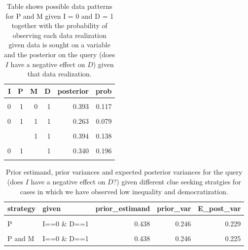 \documentclass[
  12pt,
]{book}
\begin{document}
\begin{table}

\caption{\label{tab:possibleoutcomespimdi0}Table shows possible data patterns for P and M given I = 0 and D = 1 together with the probability of observing each data realization given data is sought on a variable and the posterior on the query (does $I$ have a negative effect on $D$) given that data realization.}
\centering
\begin{tabular}[t]{rrrrrr}
\toprule
I & P & M & D & posterior & prob\\
\midrule
\cellcolor{gray!6}{0} & \cellcolor{gray!6}{0} & \cellcolor{gray!6}{0} & \cellcolor{gray!6}{1} & \cellcolor{gray!6}{0.667} & \cellcolor{gray!6}{0.050}\\
0 & 1 & 0 & 1 & 0.393 & 0.117\\
\cellcolor{gray!6}{0} & \cellcolor{gray!6}{0} & \cellcolor{gray!6}{1} & \cellcolor{gray!6}{1} & \cellcolor{gray!6}{0.571} & \cellcolor{gray!6}{0.058}\\
0 & 1 & 1 & 1 & 0.263 & 0.079\\
\cellcolor{gray!6}{0} & \cellcolor{gray!6}{} & \cellcolor{gray!6}{0} & \cellcolor{gray!6}{1} & \cellcolor{gray!6}{0.475} & \cellcolor{gray!6}{0.167}\\
\addlinespace
0 &  & 1 & 1 & 0.394 & 0.138\\
\cellcolor{gray!6}{0} & \cellcolor{gray!6}{0} & \cellcolor{gray!6}{} & \cellcolor{gray!6}{1} & \cellcolor{gray!6}{0.615} & \cellcolor{gray!6}{0.108}\\
0 & 1 &  & 1 & 0.340 & 0.196\\
\cellcolor{gray!6}{0} & \cellcolor{gray!6}{} & \cellcolor{gray!6}{} & \cellcolor{gray!6}{1} & \cellcolor{gray!6}{0.438} & \cellcolor{gray!6}{0.304}\\
\bottomrule
\end{tabular}
\end{table}

\begin{table}

\caption{\label{tab:pimdlearni0d1}Prior estimand, prior variances and expected posterior variances for the query (does $I$ have a negative effect on $D$?) given different  clue seeking  stratgies for cases in which we have observed low inequality and democratization.}
\centering
\begin{tabular}[t]{llrrr}
\toprule
strategy & given & prior\_estimand & prior\_var & E\_post\_var\\
\midrule
\cellcolor{gray!6}{None} & \cellcolor{gray!6}{I==0 \& D==1} & \cellcolor{gray!6}{0.438} & \cellcolor{gray!6}{0.246} & \cellcolor{gray!6}{0.246}\\
P & I==0 \& D==1 & 0.438 & 0.246 & 0.229\\
\cellcolor{gray!6}{M} & \cellcolor{gray!6}{I==0 \& D==1} & \cellcolor{gray!6}{0.438} & \cellcolor{gray!6}{0.246} & \cellcolor{gray!6}{0.245}\\
P and M & I==0 \& D==1 & 0.438 & 0.246 & 0.225\\
\bottomrule
\end{tabular}
\end{table}
\end{document}
